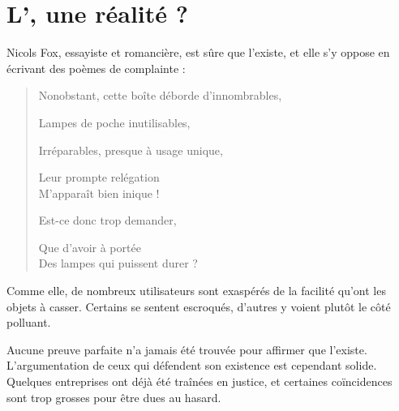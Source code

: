 \section{L'\op, une réalité ?}

Nicols Fox, essayiste et romancière, est sûre que l'\op existe, et elle s'y oppose en écrivant des poèmes de complainte : 
\itshape\begin{center}
\begin{verse}
Nonobstant, cette boîte déborde d'innombrables,

Lampes de poche inutilisables,

Irréparables, presque à usage unique,

Leur prompte relégation\\
M’apparaît bien inique !

Est-ce donc trop demander,

Que d'avoir à portée\\
Des lampes qui puissent durer ?
\end{verse}
\end{center}
\normalfont
Comme elle, de nombreux utilisateurs sont exaspérés de la facilité qu'ont les objets à casser. Certains se sentent escroqués, d'autres y voient plutôt le côté polluant. 

\bigbreak

Aucune preuve parfaite n'a jamais été trouvée pour affirmer que l'\op existe. L'argumentation de ceux qui défendent son existence est cependant solide. Quelques entreprises ont déjà été traînées en justice, et certaines coïncidences sont trop grosses pour être dues au hasard.
